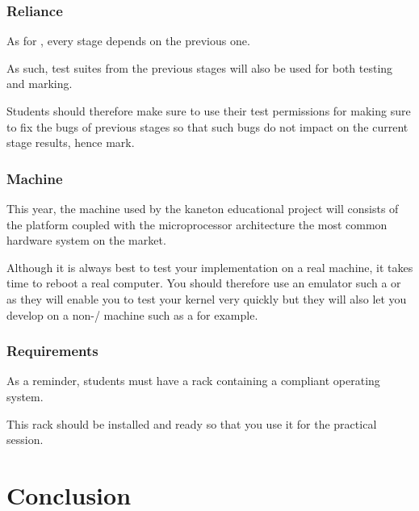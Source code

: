 
\begin{frame}
  \frametitle{Reliance}

  As for , every stage depends on the previous one.

  \-

  As such, test suites from the previous stages will also be used for both
  testing and marking.

  \-

  Students should therefore make sure to use their test permissions for making
  sure to fix the bugs of previous stages so that such bugs do not impact
  on the current stage results, hence mark.
\end{frame}


\begin{frame}
  \frametitle{Machine}

  This year, the machine used by the kaneton educational project will consists
  of the  platform coupled with the  microprocessor
  architecture \ie{} the most common hardware system on the market.

  \-

  Although it is always best to test your implementation on a real machine,
  it takes time to reboot a real computer. You should therefore use an
  emulator such a  or  as they will enable you to
  test your kernel very quickly but they will also let you develop on
  a non-/ machine such as a  for example.
\end{frame}


\begin{frame}
  \frametitle{Requirements}

  As a reminder, students must have a rack containing a  compliant
  operating system.

  \-

  This rack should be installed and ready so that you use it for the
   practical session.
\end{frame}

%
%

\section{Conclusion}


